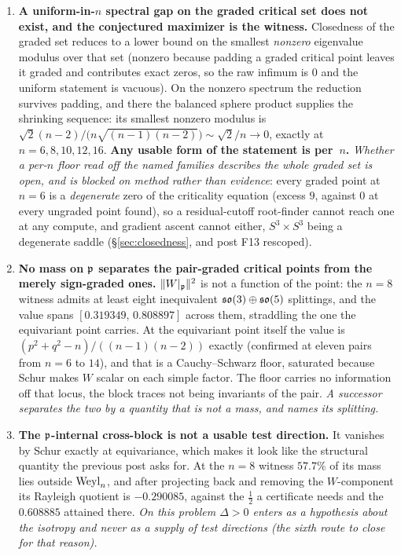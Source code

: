 \begin{enumerate}[leftmargin=1.8em]
\item \textbf{A uniform-in-$n$ spectral gap on the graded critical set does not exist, and the conjectured maximizer is the witness.} Closedness of the graded set reduces to a lower bound on the smallest \emph{nonzero} eigenvalue modulus over that set (nonzero because padding a graded critical point leaves it graded and contributes exact zeros, so the raw infimum is $0$ and the uniform statement is vacuous). On the nonzero spectrum the reduction survives padding, and there the balanced sphere product supplies the shrinking sequence: its smallest nonzero modulus is $\sqrt2(n-2)/\big(n\sqrt{(n-1)(n-2)}\big)\sim\sqrt2/n\to0$, exactly at $n=6,8,10,12,16$. \textbf{Any usable form of the statement is per~$n$.} \emph{Whether a per-$n$ floor read off the named families describes the whole graded set is open, and is blocked on method rather than evidence}: every graded point at $n=6$ is a \emph{degenerate} zero of the criticality equation (excess $9$, against $0$ at every ungraded point found), so a residual-cutoff root-finder cannot reach one at any compute, and gradient ascent cannot either, $S^3\times S^3$ being a degenerate saddle (\S\ref{sec:closedness}, and post F13 rescoped).

\item \textbf{No mass on $\mathfrak{p}$ separates the pair-graded critical points from the merely sign-graded ones.} $\|W|_{\mathfrak{p}}\|^2$ is not a function of the point: the $n=8$ witness admits at least eight inequivalent $\mathfrak{so}(3)\oplus\mathfrak{so}(5)$ splittings, and the value spans $[0.319349,\,0.808897]$ across them, straddling the one the equivariant point carries. At the equivariant point itself the value is $(p^2+q^2-n)/((n-1)(n-2))$ exactly (confirmed at eleven pairs from $n=6$ to $14$), and that is a Cauchy--Schwarz floor, saturated because Schur makes $W$ scalar on each simple factor. The floor carries no information off that locus, the block traces not being invariants of the pair. \emph{A successor separates the two by a quantity that is not a mass, and names its splitting.}

\item \textbf{The $\mathfrak{p}$-internal cross-block is not a usable test direction.} It vanishes by Schur exactly at equivariance, which makes it look like the structural quantity the previous post asks for. At the $n=8$ witness $57.7\%$ of its mass lies outside $\mathrm{Weyl}_n$, and after projecting back and removing the $W$-component its Rayleigh quotient is $-0.290085$, against the $\tfrac12$ a certificate needs and the $0.608885$ attained there. \emph{On this problem $\Delta>0$ enters as a hypothesis about the isotropy and never as a supply of test directions (the sixth route to close for that reason).}


\end{enumerate}

